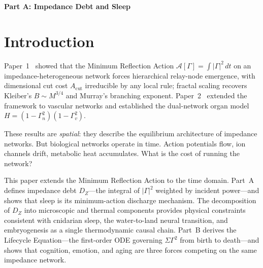 \documentclass[aps,pre,twocolumn,superscriptaddress,floatfix]{revtex4-2}
\begin{document}
\begin{abstract}
\textbf{Part~C} proves that C2 is the \emph{universal}
update law: we map all twenty-nine known
tissue-update mechanisms to the single rule
$\Delta Z = -\eta\,\Gamma\,x_{\text{in}}\,x_{\text{out}}$,
identify the thermodynamic boundaries of life
(ice, fire, Goldilocks 37\textdegree C), and derive the
two central controllers (cardiac pump, regulatory brain)
whose failure propagates $\Gamma$ error to every
downstream organ.
Together, Parts~A--C establish that temporal dynamics,
lifecycle, and tissue adaptation are all consequences of
$\mathcal{A}[\Gamma] \to \min$.
\end{abstract}

\maketitle


\bigskip\noindent\textbf{\large Part A: Impedance Debt and Sleep}
\label{part:A}
\bigskip


\section{Introduction}
\label{sec:intro}

Paper~1~\cite{Paper1} showed that the Minimum
Reflection Action $\mathcal{A}[\Gamma] = \int |\Gamma|^2\,dt$
on an impedance-heterogeneous network forces hierarchical
relay-node emergence, with dimensional cut cost $A_{\mathrm{cut}}$
irreducible by any local rule; fractal scaling recovers
Kleiber's $B \sim M^{3/4}$ and Murray's branching exponent.
Paper~2~\cite{Paper2} extended the framework to vascular
networks and established the dual-network organ model
$H = (1-\Gamma_n^2)(1-\Gamma_v^2)$.

These results are \emph{spatial}: they describe the
equilibrium architecture of impedance networks.
But biological networks operate in time.
Action potentials flow, ion channels drift,
metabolic heat accumulates.
What is the cost of running the network?

This paper extends the Minimum Reflection Action to the
time domain.
Part~A defines impedance debt $D_Z$---the integral of
$|\Gamma|^2$ weighted by incident power---and shows that
sleep is its minimum-action discharge mechanism.
The decomposition of $D_Z$ into microscopic and thermal
components provides physical constraints consistent with
cnidarian sleep, the water-to-land neural transition,
and embryogenesis as a single thermodynamic causal chain.
Part~B derives the Lifecycle Equation---the first-order ODE
governing $\Sigma\Gamma^2$ from birth to death---and shows
that cognition, emotion, and aging are three forces competing
on the same impedance network.
\end{document}
